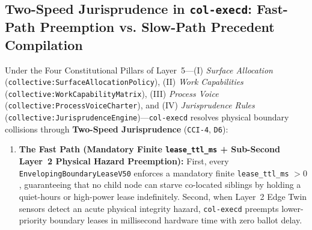 \subsection{Two-Speed Jurisprudence in \texttt{col-execd}: Fast-Path Preemption vs. Slow-Path Precedent Compilation}

Under the Four Constitutional Pillars of Layer~5---(I) \textit{Surface Allocation}
(\texttt{collective:SurfaceAllocationPolicy}), (II) \textit{Work Capabilities}
(\texttt{collective:WorkCapabilityMatrix}), (III) \textit{Process Voice}
(\texttt{collective:ProcessVoiceCharter}), and (IV) \textit{Jurisprudence Rules}
(\texttt{collective:JurisprudenceEngine})---\texttt{col-execd} resolves physical boundary
collisions through \textbf{Two-Speed Jurisprudence} (\texttt{CCI-4}, \texttt{D6}):

\begin{enumerate}
\item \textbf{The Fast Path (Mandatory Finite \texttt{lease\_ttl\_ms} + Sub-Second Layer~2 Physical Hazard Preemption):}
        First, every \texttt{EnvelopingBoundaryLeaseV50} enforces a mandatory finite
        \texttt{lease\_ttl\_ms} $> 0$, guaranteeing that no child node can starve co-located
        siblings by holding a quiet-hours or high-power lease indefinitely. Second, when
        Layer~2 Edge Twin sensors detect an acute physical integrity hazard, \texttt{col-execd}
        preempts lower-priority boundary leases in millisecond hardware time with zero ballot
        delay.


\end{enumerate}
